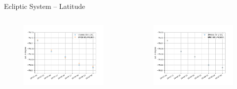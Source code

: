 \documentclass{beamer}
\begin{document}
\begin{frame}{Ecliptic System -- Latitude}

\begin{columns}
	\hspace{-1cm}
	\begin{figure}									
		\includegraphics[width=1.25\textwidth]{Pics/ECL_LAT_zoom.png}
	\end{figure}
		\begin{figure}									
			\includegraphics[width=1.25\textwidth]{Pics/ECL_LAT_zoom_rou.png}
		\end{figure}
\end{columns}

\end{frame}
\end{document}
